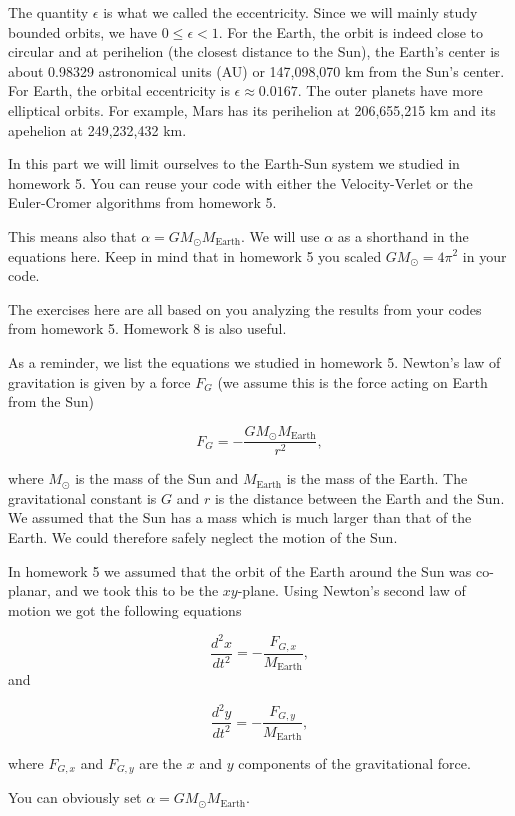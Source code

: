 \documentclass[%
oneside,                 %
final,                   %
10pt]{article}
\begin{document}
The quantity $\epsilon$ is what we called the eccentricity. Since we
will mainly study bounded orbits, we have $0 \le \epsilon < 1$.  For
the Earth, the orbit is indeed close to circular and at perihelion
(the closest distance to the Sun), the Earth's center is about 0.98329
astronomical units (AU) or 147,098,070 km from the Sun's center. For
Earth, the orbital eccentricity is $\epsilon\approx 0.0167$. The outer
planets have more elliptical orbits. For example, Mars has its
perihelion at 206,655,215 km and its apehelion at 249,232,432 km.

In this part we will limit ourselves to the Earth-Sun system we
studied in homework 5. You can reuse your code with either the
Velocity-Verlet or the Euler-Cromer algorithms from homework 5.

This means also that $\alpha=GM_{\odot}M_{\mathrm{Earth}}$. We will
use $\alpha$ as a shorthand in the equations here. Keep in mind that
in homework 5 you scaled $GM_{\odot}=4\pi^2$ in your code.

The exercises here are all based on you analyzing the results from your codes from homework 5. Homework 8 is also useful.

As a reminder, we list the equations we studied in homework 5.
Newton's law of gravitation is given by a force $F_G$ (we assume this
is the force acting on Earth from the Sun)

\[
F_G=-\frac{GM_{\odot}M_{\mathrm{Earth}}}{r^2},
\]

where $M_{\odot}$ is the mass of the Sun and $M_{\mathrm{Earth}}$ is
the mass of the Earth. The gravitational constant is $G$ and $r$ is
the distance between the Earth and the Sun.  We assumed that the Sun
has a mass which is much larger than that of the Earth. We could
therefore safely neglect the motion of the Sun.

In homework 5 we assumed that the orbit of the Earth around the Sun 
was co-planar, and we took this to be the $xy$-plane.
Using Newton's second law of motion we got the following equations

\[
\frac{d^2x}{dt^2}=-\frac{F_{G,x}}{M_{\mathrm{Earth}}},
\]
and

\[
\frac{d^2y}{dt^2}=-\frac{F_{G,y}}{M_{\mathrm{Earth}}},
\]

where $F_{G,x}$ and $F_{G,y}$ are the $x$ and $y$ components of the
gravitational force.

You can obviously set $\alpha=GM_{\odot}M_{\mathrm{Earth}}$.
\end{document}
